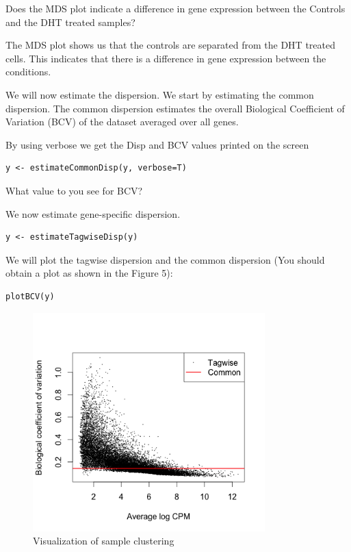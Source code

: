 \begin{questions}
Does the MDS plot indicate a difference in gene expression between the Controls and the DHT treated samples?\begin{answer}
The MDS plot shows us that the controls are separated from the DHT treated cells. This indicates that there is a difference in gene expression between the conditions.	
\end{answer}
\end{questions}
We will now estimate the dispersion. We start by estimating the common dispersion. The common dispersion estimates the overall Biological Coefficient of Variation (BCV) of the dataset averaged over all genes. 
\begin{steps}
By using verbose we get the Disp and BCV values printed on the screen
\begin{lstlisting}
y <- estimateCommonDisp(y, verbose=T)
\end{lstlisting}

\begin{questions}
What value to you see for BCV?
\end{questions}

\begin{steps}
We now estimate gene-specific dispersion.
\begin{lstlisting}
y <- estimateTagwiseDisp(y) 
\end{lstlisting}



We will plot the tagwise dispersion and the common dispersion (You should obtain a plot as shown in the Figure 5):
\begin{lstlisting}
plotBCV(y)
\end{lstlisting}

\end{steps}
\begin{figure}[H]
\centering
\includegraphics[width=0.8\textwidth]{handout/BCV.png}
\caption{Visualization of sample clustering}
\label{fig:BCV plot}
\end{figure}


\end{steps}
